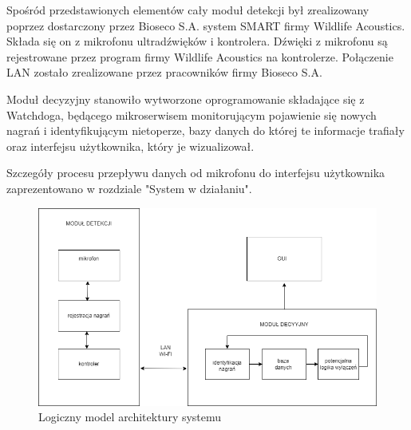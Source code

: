 \documentclass{sprz}
\begin{document}
Spośród przedstawionych elementów cały moduł detekcji był zrealizowany poprzez dostarczony przez Bioseco S.A. system SMART firmy Wildlife Acoustics. Składa się on z mikrofonu ultradźwięków i kontrolera. Dźwięki z mikrofonu są rejestrowane przez program firmy Wildlife Acoustics na kontrolerze. Połączenie LAN zostało zrealizowane przez pracowników firmy Bioseco S.A.

Moduł decyzyjny stanowiło wytworzone oprogramowanie składające się z Watchdoga, będącego mikroserwisem monitorującym pojawienie się nowych nagrań i identyfikującym nietoperze, bazy danych do której te informacje trafiały oraz interfejsu użytkownika, który je wizualizował.

Szczegóły procesu przepływu danych od mikrofonu do interfejsu użytkownika zaprezentowano w rozdziale "System w działaniu".

\begin{figure}[h]
    \centering
    \includegraphics[width=1.0\textwidth]{sprz/architektura_systemu2.png}
    \caption{Logiczny model architektury systemu}
    \label{img:architektura_systemu2}
\end{figure}
\clearpage
\end{document}
